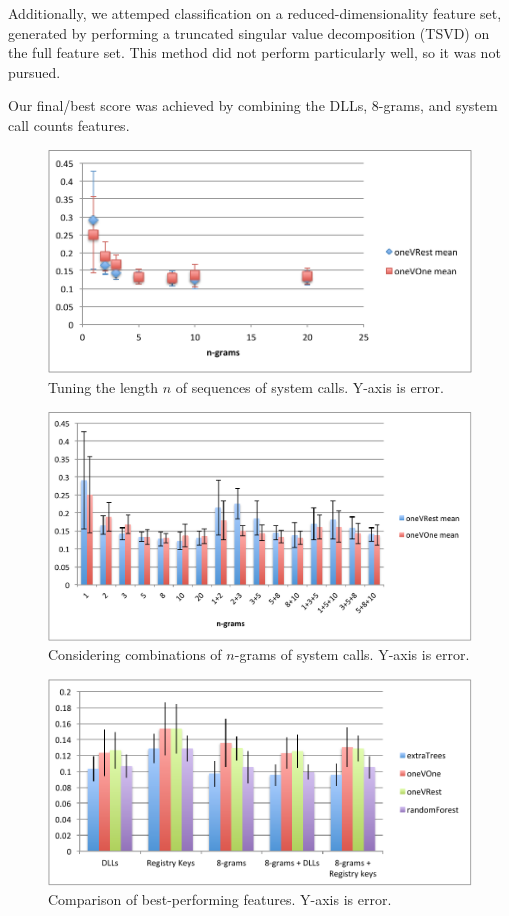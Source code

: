 \documentclass[11pt]{amsart}
\begin{document}
Additionally, we attemped classification on a reduced-dimensionality feature set, generated by performing a truncated singular value decomposition (TSVD) on the full feature set. This method did not perform particularly well, so it was not pursued. 

Our final/best score was achieved by combining the DLLs, 8-grams, and system call counts features.

\begin{figure}
  \includegraphics{n-grams.pdf}
  \caption{Tuning the length $n$ of sequences of system calls. Y-axis is error.}
\end{figure}

\begin{figure}
  \includegraphics{n-grams-combos.pdf}
  \caption{Considering combinations of $n$-grams of system calls. Y-axis is error.}
\end{figure}

\begin{figure}
  \includegraphics{other_features.pdf}
  \caption{Comparison of best-performing features. Y-axis is error.}
\end{figure}
\end{document}
